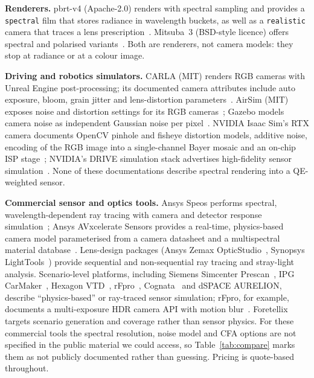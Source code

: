 \documentclass[letterpaper,twocolumn,fleqn]{article}
\begin{document}
\textbf{Renderers.} pbrt-v4 (Apache-2.0) renders with spectral sampling and provides a \texttt{spectral} film that stores radiance in wavelength buckets, as well as a \texttt{realistic} camera that traces a lens prescription~\cite{pharr2023pbrt,pbrtv4format,kolb1995realistic}. Mitsuba~3 (BSD-style licence) offers spectral and polarised variants~\cite{nimier2019mitsuba2,mitsuba3variants}. Both are renderers, not camera models: they stop at radiance or at a colour image.

\textbf{Driving and robotics simulators.} CARLA (MIT) renders RGB cameras with Unreal Engine post-processing; its documented camera attributes include auto exposure, bloom, grain jitter and lens-distortion parameters~\cite{carlasensors}. AirSim (MIT) exposes noise and distortion settings for its RGB cameras~\cite{airsimsettings}; Gazebo models camera noise as independent Gaussian noise per pixel~\cite{gazebonoise}. NVIDIA Isaac Sim's RTX camera documents OpenCV pinhole and fisheye distortion models, additive noise, encoding of the RGB image into a single-channel Bayer mosaic and an on-chip ISP stage~\cite{isaaccamera}; NVIDIA's DRIVE simulation stack advertises high-fidelity sensor simulation~\cite{nvidiadrivesim}. None of these documentations describe spectral rendering into a QE-weighted sensor.

\textbf{Commercial sensor and optics tools.} Ansys Speos performs spectral, wavelength-dependent ray tracing with camera and detector response simulation~\cite{ansysspeos,falahati2026speos}; Ansys AVxcelerate Sensors provides a real-time, physics-based camera model parameterised from a camera datasheet and a multispectral material database~\cite{ansysavx}. Lens-design packages (Ansys Zemax OpticStudio~\cite{ansyszemax}, Synopsys LightTools~\cite{synopsyslighttools}) provide sequential and non-sequential ray tracing and stray-light analysis. Scenario-level platforms, including Siemens Simcenter Prescan~\cite{siemensprescan}, IPG CarMaker~\cite{ipgcarmaker}, Hexagon VTD~\cite{son2023vtd}, rFpro~\cite{rfproraytracing}, Cognata~\cite{cognata} and dSPACE AURELION, describe ``physics-based'' or ray-traced sensor simulation; rFpro, for example, documents a multi-exposure HDR camera API with motion blur~\cite{rfproraytracing}. Foretellix~\cite{foretellix} targets scenario generation and coverage rather than sensor physics. For these commercial tools the spectral resolution, noise model and CFA options are not specified in the public material we could access, so Table~\ref{tab:compare} marks them as not publicly documented rather than guessing. Pricing is quote-based throughout.
\end{document}
